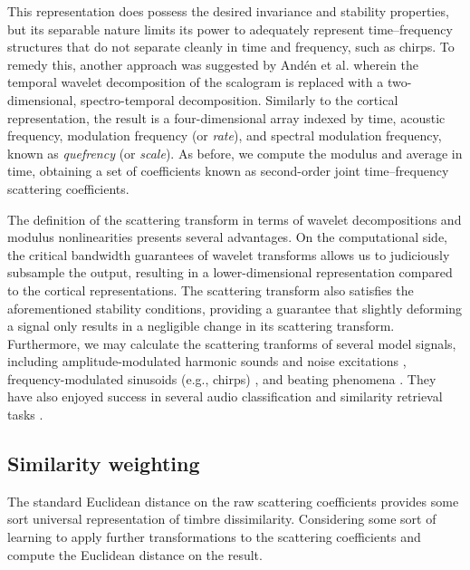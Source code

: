 \documentclass{bmcart}
\begin{document}
This representation does possess the desired invariance and stability properties, but its separable nature limits its power to adequately represent time--frequency structures that do not separate cleanly in time and frequency, such as chirps.
To remedy this, another approach was suggested by And\'{e}n et al. \cite{anden2015mlsp,anden2019tsp} wherein the temporal wavelet decomposition of the scalogram is replaced with a two-dimensional, spectro-temporal decomposition.
Similarly to the cortical representation, the result is a four-dimensional array indexed by time, acoustic frequency, modulation frequency (or \emph{rate}), and spectral modulation frequency, known as \emph{quefrency} (or \emph{scale}).
As before, we compute the modulus and average in time, obtaining a set of coefficients known as second-order joint time--frequency scattering coefficients.

The definition of the scattering transform in terms of wavelet decompositions and modulus nonlinearities presents several advantages.
On the computational side, the critical bandwidth guarantees of wavelet transforms allows us to judiciously subsample the output, resulting in a lower-dimensional representation compared to the cortical representations.
The scattering transform also satisfies the aforementioned stability conditions, providing a guarantee that slightly deforming a signal only results in a negligible change in its scattering transform.
Furthermore, we may calculate the scattering tranforms of several model signals, including amplitude-modulated harmonic sounds and noise excitations \cite{anden2012scattering,anden2014deep}, frequency-modulated sinusoids (e.g., chirps) \cite{anden2012scattering,anden2019tsp}, and beating phenomena \cite{anden2014deep}.
They have also enjoyed success in several audio classification and similarity retrieval tasks \cite{anden2011multiscale,bauge2013representing,anden2014deep,anden2019tsp,lostanlen2018jasmp,lostanlen2018extended}.

\subsection*{Similarity weighting}
\label{sec:weighting}

The standard Euclidean distance on the raw scattering coefficients  provides some sort universal representation of timbre dissimilarity. Considering some sort of learning to apply further transformations to the scattering coefficients and compute the Euclidean distance on the result.
\end{document}
